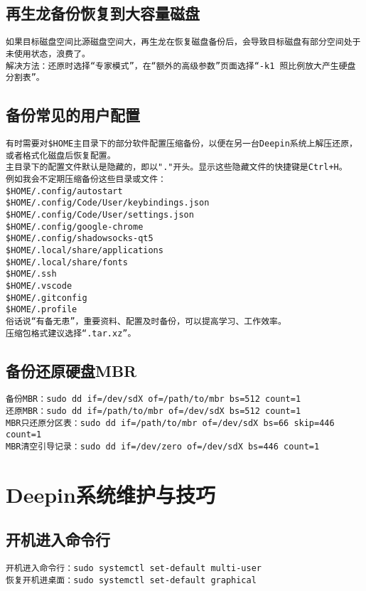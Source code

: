 \documentclass[a4paper,fontset=fandol,zihao=-4,linespread=1.2]{ctexbook}
\begin{document}
\section{再生龙备份恢复到大容量磁盘}
\begin{lstlisting}
如果目标磁盘空间比源磁盘空间大，再生龙在恢复磁盘备份后，会导致目标磁盘有部分空间处于未使用状态，浪费了。
解决方法：还原时选择“专家模式”，在“额外的高级参数”页面选择“-k1 照比例放大产生硬盘分割表”。
\end{lstlisting}

\section{备份常见的用户配置}
\begin{lstlisting}
有时需要对$HOME主目录下的部分软件配置压缩备份，以便在另一台Deepin系统上解压还原，或者格式化磁盘后恢复配置。
主目录下的配置文件默认是隐藏的，即以"."开头。显示这些隐藏文件的快捷键是Ctrl+H。
例如我会不定期压缩备份这些目录或文件：
$HOME/.config/autostart
$HOME/.config/Code/User/keybindings.json
$HOME/.config/Code/User/settings.json
$HOME/.config/google-chrome
$HOME/.config/shadowsocks-qt5
$HOME/.local/share/applications
$HOME/.local/share/fonts
$HOME/.ssh
$HOME/.vscode
$HOME/.gitconfig
$HOME/.profile
俗话说“有备无患”，重要资料、配置及时备份，可以提高学习、工作效率。
压缩包格式建议选择“.tar.xz”。
\end{lstlisting}

\section{备份还原硬盘MBR}
\begin{lstlisting}
备份MBR：sudo dd if=/dev/sdX of=/path/to/mbr bs=512 count=1
还原MBR：sudo dd if=/path/to/mbr of=/dev/sdX bs=512 count=1
MBR只还原分区表：sudo dd if=/path/to/mbr of=/dev/sdX bs=66 skip=446 count=1
MBR清空引导记录：sudo dd if=/dev/zero of=/dev/sdX bs=446 count=1
\end{lstlisting}


\chapter{Deepin系统维护与技巧}

\section{开机进入命令行}
\begin{lstlisting}
开机进入命令行：sudo systemctl set-default multi-user
恢复开机进桌面：sudo systemctl set-default graphical
\end{lstlisting}
\end{document}
